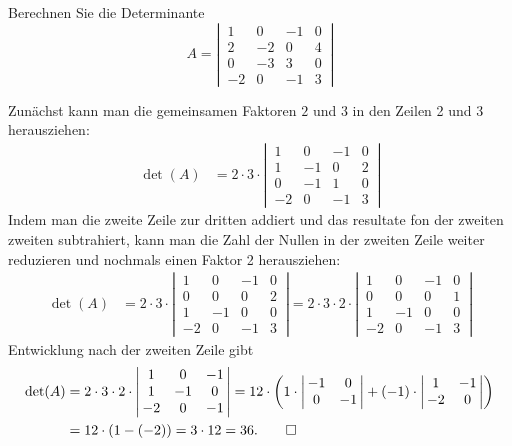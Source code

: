 Berechnen Sie die Determinante 
\[
A=\left|\,\begin{matrix}
 1& 0&-1&0\\
 2&-2& 0&4\\
 0&-3& 3&0\\
-2& 0&-1&3
\end{matrix}\,\right|
\]


\begin{loesung}
Zunächst kann man die gemeinsamen Faktoren $2$ und $3$ in den Zeilen 2 und 3
herausziehen:
\begin{align*}
\det(A)
&=
2\cdot 3\cdot
\left|\,\begin{matrix}
 1& 0&-1&0\\
 1&-1& 0&2\\
 0&-1& 1&0\\
-2& 0&-1&3
\end{matrix}\,\right|
\end{align*}
Indem man die zweite Zeile zur dritten addiert und das resultate fon der zweiten
zweiten subtrahiert,
kann man die Zahl der Nullen in der zweiten Zeile weiter reduzieren und
nochmals einen Faktor 2 herausziehen:
\begin{align*}
\det(A)
&=
2\cdot 3\cdot
\left|\,\begin{matrix}
 1& 0&-1&0\\
 0& 0& 0&2\\
 1&-1& 0&0\\
-2& 0&-1&3
\end{matrix}\,\right|
=
2\cdot 3\cdot2\cdot
\left|\,\begin{matrix}
 1& 0&-1&0\\
 0& 0& 0&1\\
 1&-1& 0&0\\
-2& 0&-1&3
\end{matrix}\,\right|
\end{align*}
Entwicklung nach der zweiten Zeile gibt
\begin{align*}
\det(A)
&=
2\cdot 3\cdot2\cdot
\left|\,\begin{matrix}
 1& 0&-1\\
 1&-1& 0\\
-2& 0&-1
\end{matrix}\,\right|
=
12\cdot \biggl(
1\cdot
\left|\,\begin{matrix}-1& 0\\ 0&-1\end{matrix}\,\right|
+
(-1)\cdot
\left|\,\begin{matrix} 1&-1\\-2& 0\end{matrix}\,\right|
\biggr)
\\
&=12\cdot(1-(-2))=3\cdot 12=36.
\qedhere
\end{align*}


\end{loesung}
